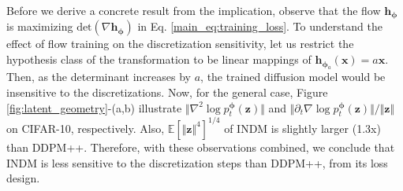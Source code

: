 \documentclass{article}
\theoremstyle{definition}
\theoremstyle{remark}
\begin{document}
	Before we derive a concrete result from the implication, observe that the flow $\mathbf{h}_{\bm{\phi}}$ is maximizing $\text{det}(\nabla\mathbf{h}_{\bm{\phi}})$ in Eq. \eqref{main_eq:training_loss}. To understand the effect of flow training on the discretization sensitivity, let us restrict the hypothesis class of the transformation to be linear mappings of $\mathbf{h}_{\bm{\phi}_{a}}(\mathbf{x})=a\mathbf{x}$. Then, as the determinant increases by $a$, the trained diffusion model would be insensitive to the discretizations. Now, for the general case, Figure \ref{fig:latent_geometry}-(a,b) illustrate $\Vert\nabla^{2}\log{p_{t}^{\bm{\phi}}(\mathbf{z})}\Vert$ and $\Vert\partial_{t}\nabla\log{p_{t}^{\bm{\phi}}(\mathbf{z})}\Vert/\Vert\mathbf{z}\Vert$ on CIFAR-10, respectively. Also, $\mathbb{E}[\Vert\mathbf{z}\Vert^{4}]^{1/4}$ of INDM is slightly larger (1.3x) than DDPM++. Therefore, with these observations combined, we conclude that INDM is less sensitive to the discretization steps than DDPM++, from its loss design.
	
\end{document}
